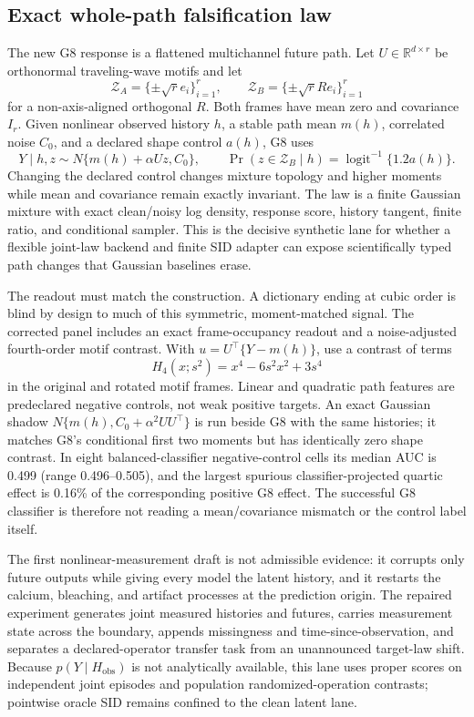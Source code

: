 \documentclass[10pt]{article}
\begin{document}
\subsection{Exact whole-path falsification law}

The new G8 response is a flattened multichannel future path.  Let
$U\in\mathbb R^{d\times r}$ be orthonormal traveling-wave motifs and let
\[
 \mathcal Z_A=\{\pm\sqrt r e_i\}_{i=1}^r,
 \qquad
 \mathcal Z_B=\{\pm\sqrt r R e_i\}_{i=1}^r
\]
for a non-axis-aligned orthogonal $R$.  Both frames have mean zero and covariance
$I_r$.  Given nonlinear observed history $h$, a stable path mean $m(h)$, correlated
noise $C_0$, and a declared shape control $a(h)$, G8 uses
\[
 Y\mid h,z\sim N\{m(h)+\alpha Uz,C_0\},\qquad
 \Pr(z\in\mathcal Z_B\mid h)=\operatorname{logit}^{-1}\{1.2a(h)\}.
\]
Changing the declared control changes mixture topology and higher moments while
mean and covariance remain exactly invariant.  The law is a finite Gaussian
mixture with exact clean/noisy log density, response score, history tangent, finite
ratio, and conditional sampler.  This is the decisive synthetic lane for whether
a flexible joint-law backend and finite SID adapter can expose scientifically typed
path changes that Gaussian baselines erase.

The readout must match the construction.  A dictionary ending at cubic order is
blind by design to much of this symmetric, moment-matched signal.  The corrected
panel includes an exact frame-occupancy readout and a noise-adjusted fourth-order
motif contrast.  With $u=U^\top\{Y-m(h)\}$, use a contrast of terms
\[
 H_4(x;s^2)=x^4-6s^2x^2+3s^4
\]
in the original and rotated motif frames.  Linear and quadratic path features are
predeclared negative controls, not weak positive targets.  An exact Gaussian
shadow $N\{m(h),C_0+\alpha^2UU^\top\}$ is run beside G8 with the same histories;
it matches G8's conditional first two moments but has identically zero shape
contrast.  In eight balanced-classifier negative-control cells its median AUC is
0.499 (range 0.496--0.505), and the largest spurious classifier-projected quartic
effect is 0.16\% of the corresponding positive G8 effect.  The successful G8
classifier is therefore not reading a mean/covariance mismatch or the control
label itself.

The first nonlinear-measurement draft is not admissible evidence: it corrupts only
future outputs while giving every model the latent history, and it restarts the
calcium, bleaching, and artifact processes at the prediction origin.  The repaired
experiment generates joint measured histories and futures, carries measurement
state across the boundary, appends missingness and time-since-observation, and
separates a declared-operator transfer task from an unannounced target-law shift.
Because $p(Y\mid H_{\mathrm{obs}})$ is not analytically available, this lane uses
proper scores on independent joint episodes and population randomized-operation
contrasts; pointwise oracle SID remains confined to the clean latent lane.
\end{document}

